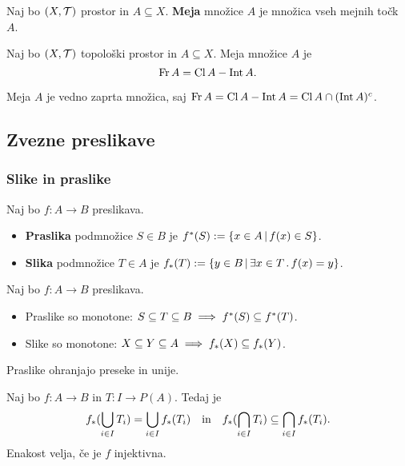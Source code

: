 \begin{definicija}
    Naj bo $(X, \mathcal{T})$ prostor in $A \subseteq X$. \textbf{Meja} množice $A$ je množica vseh mejnih točk $A$.
\end{definicija}

\begin{trditev}
    Naj bo $(X, \mathcal{T})$ topološki prostor in $A \subseteq X$. Meja množice $A$ je $$\operatorname{Fr} A = \operatorname{Cl} A - \operatorname{Int} A.$$
\end{trditev}

\begin{opomba}
    Meja $A$ je vedno zaprta množica, saj $\operatorname{Fr} A = \operatorname{Cl} A - \operatorname{Int} A = \operatorname{Cl} A \cap (\operatorname{Int} A)^c$.
\end{opomba}

\subsection{Zvezne preslikave}
\subsubsection{Slike in praslike}
\begin{definicija}
    Naj bo $f: A \to B$ preslikava.
    \begin{itemize}
        \item \textbf{Praslika} podmnožice $S \in B$ je $f^*(S) := \{x \in A \,|\, f(x) \in S\}$.
        \item \textbf{Slika} podmnožice $T \in A$ je $f_*(T) := \{y \in B \,|\, \exists x \in T \,.\, f(x) = y\}$.
    \end{itemize}
\end{definicija}

\begin{trditev}
    Naj bo $f: A \to B$ preslikava.
    \begin{itemize}
        \item Praslike so monotone: $S \subseteq T \subseteq B \implies f^{*}(S) \subseteq f^{*}(T)$.
        \item Slike so monotone: $X \subseteq Y \subseteq A \implies f_{*}(X) \subseteq f_{*}(Y)$.
    \end{itemize}
\end{trditev}

\begin{trditev}
    Praslike ohranjajo preseke in unije.
\end{trditev}

\begin{trditev}
    Naj bo $f: A \to B$ in $T: I \to P(A)$. Tedaj je
    $$f_{*}(\bigcup_{i \in I} T_i) = \bigcup_{i \in I} f_{*}(T_i) \quad \text{in} \quad f_{*}(\bigcap_{i \in I} T_i) \subseteq \bigcap_{i \in I} f_{*}(T_i).$$
    Enakost velja, če je $f$ injektivna.
\end{trditev}

